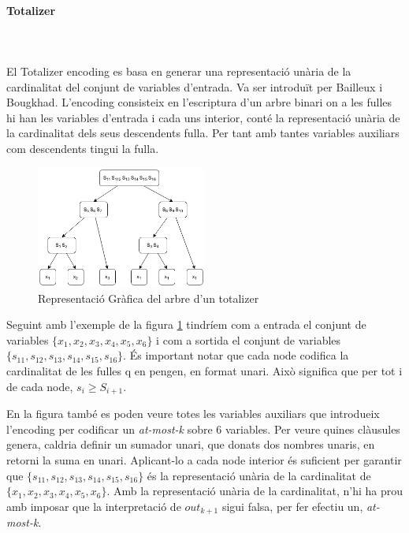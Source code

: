 \documentclass[11pt,a4paper,twoside]{report}
\begin{document}
  \paragraph*{Totalizer} ~\\~\\
  El Totalizer encoding es basa en generar una representació unària de la cardinalitat del conjunt de variables d'entrada. 
  Va ser introduït per Bailleux i Bougkhad\cite{Bailleux2003EfficientCE}. L'encoding consisteix en l'escriptura d'un arbre binari on a les fulles hi han les variables d'entrada i cada uns interior, 
  conté la representació unària de la cardinalitat dels seus descendents fulla. Per tant amb tantes variables auxiliars com descendents tingui la fulla.

  \begin{figure}[ht!]
    \centering
    \includegraphics[width=0.5\textwidth]{Diagrames/totalizer.png}
    \caption{Representació Gràfica del arbre d'un totalizer}
    \label{fig:totalizer}
  \end{figure}

  Seguint amb l'exemple de la figura \ref{fig:totalizer} tindríem com a entrada el conjunt de variables $\{x_1, x_2, x_3, x_4, x_5, x_6\}$ i com a sortida el conjunt de variables $\{s_{11}, s_{12}, s_{13}, s_{14}, s_{15}, s_{16}\}$. És important notar que cada node codifica la cardinalitat de les fulles q en pengen, en format unari. Això significa que per tot i de cada node, $s_i \geq S_{i+1}$.

  En la figura també es poden veure totes les variables auxiliars que introdueix l'encoding per codificar un \textit{at-most-k} sobre 6 variables. Per veure quines clàusules genera, caldria definir un sumador unari, que donats dos nombres unaris, en retorni la suma en unari. 
  Aplicant-lo a cada node interior és suficient per garantir que $\{s_{11}, s_{12}, s_{13}, s_{14}, s_{15}, s_{16}\}$ és la representació unària de la cardinalitat de $\{x_1, x_2, x_3, x_4, x_5, x_6\}$. 
  Amb la representació unària de la cardinalitat, n'hi ha prou amb imposar que la interpretació de $out_{k+1}$ sigui falsa, per fer efectiu un, \textit{at-most-k}. 
 
\end{document}
